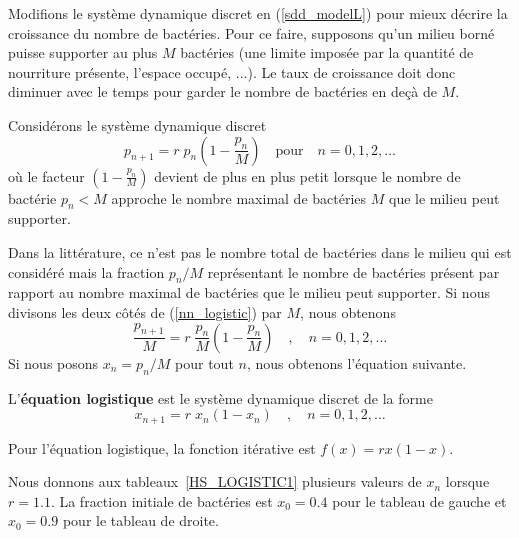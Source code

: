 {Modifions le système dynamique discret en (\ref{sdd_modelL}) pour
mieux décrire la croissance du nombre de bactéries.  Pour ce faire,
supposons qu'un milieu borné puisse supporter au plus $M$ bactéries
(une limite imposée par la quantité de nourriture présente, l'espace
occupé, ...).  Le taux de croissance doit donc diminuer avec le temps
pour garder le nombre de bactéries en deçà de $M$.

Considérons le système dynamique discret
\begin{equation}\label{nn_logistic}
p_{n+1} = r\;p_n\left( 1 - \frac{p_n}{M}\right) \quad \text{pour} \quad
n=0,1,2,\ldots
\end{equation}
où le facteur $\displaystyle \left( 1 - \frac{p_n}{M}\right)$ devient
de plus en plus petit lorsque le nombre de bactérie $p_n < M$ approche
le nombre maximal de bactéries $M$ que le milieu peut supporter.

Dans la littérature, ce n'est pas le nombre total de bactéries
dans le milieu qui est considéré mais la fraction $p_n/M$ représentant
le nombre de bactéries présent par rapport au nombre maximal de
bactéries que le milieu peut supporter.  Si nous divisons les deux
côtés de (\ref{nn_logistic}) par $M$, nous obtenons
\[
\frac{p_{n+1}}{M} = r\;\frac{p_n}{M}\left( 1 - \frac{p_n}{M}\right)
\quad , \quad n=0,1,2,\ldots
\]
Si nous posons $x_n = p_n/M$ pour tout $n$, nous obtenons l'équation
suivante.

\begin{focus}{\dfn} 
L'{\bfseries équation logistique} est le
système dynamique discret de la forme
\begin{equation}\label{logistic}
x_{n+1} = r\;x_n ( 1-x_n) \quad , \quad n=0, 1, 2, \ldots
\end{equation}
\label{defOfLogEqu}
\end{focus}

Pour l'équation logistique, la fonction itérative est
$f(x) = r x(1-x)$.

Nous donnons aux tableaux~\ref{HS_LOGISTIC1} plusieurs valeurs de $x_n$
lorsque $r=1.1$.  La fraction initiale de bactéries est $x_0 = 0.4$
pour le tableau de gauche et $x_0 = 0.9$ pour le tableau de droite.

}
